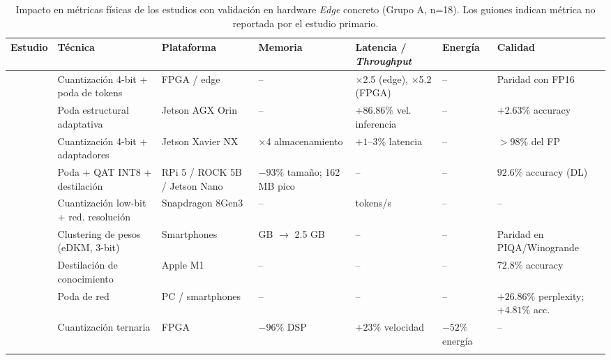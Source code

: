 \begin{table}
\centering
\caption{Impacto en métricas físicas de los estudios con validación en hardware \emph{Edge} concreto (Grupo A, n=18). Los guiones indican métrica no reportada por el estudio primario.}
\label{tab:rq4_grupoA}
\scriptsize
\renewcommand{\arraystretch}{1.3}
\begin{tabularx}{\textwidth}{@{}
    >{\hsize=0.55\hsize\raggedright\arraybackslash}X
    >{\hsize=1.15\hsize\raggedright\arraybackslash}X
    >{\hsize=1.00\hsize\raggedright\arraybackslash}X
    >{\hsize=0.95\hsize\raggedright\arraybackslash}X
    >{\hsize=1.10\hsize\raggedright\arraybackslash}X
    >{\hsize=0.80\hsize\raggedright\arraybackslash}X
    >{\hsize=1.05\hsize\raggedright\arraybackslash}X @{}}
\toprule
\textbf{Estudio} & \textbf{Técnica} & \textbf{Plataforma} & \textbf{Memoria} & \textbf{Latencia / \emph{Throughput}} & \textbf{Energía} & \textbf{Calidad} \\
\midrule
\cite{Shen2024} & Cuantización 4-bit + poda de tokens & FPGA / edge & -- & $\times$2.5 (edge), $\times$5.2 (FPGA) & -- & Paridad con FP16 \\
\addlinespace
\cite{Zheng2026a} & Poda estructural adaptativa & Jetson AGX Orin & -- & $+86.86\%$ vel. inferencia & -- & $+2.63\%$ accuracy \\
\addlinespace
\cite{Parashar2026} & Cuantización 4-bit + adaptadores & Jetson Xavier NX & $\times$4 almacenamiento & $+1$--$3\%$ latencia & -- & $>98\%$ del FP \\
\addlinespace
\cite{Ragsdale2026} & Poda + QAT INT8 + destilación & RPi 5 / ROCK 5B / Jetson Nano & $-93\%$ tamaño; 162 MB pico & -- & -- & $92.6\%$ accuracy (DL) \\
\addlinespace
\cite{Shao2025} & Cuantización low-bit + red. resolución & Snapdragon 8Gen3 & -- & 13 tokens/s & -- & -- \\
\addlinespace
\cite{Cho2024} & Clustering de pesos (eDKM, 3-bit) & Smartphones & 12.6 GB $\to$ 2.5 GB & -- & -- & Paridad en PIQA/Winogrande \\
\addlinespace
\cite{Pradhan2026} & Destilación de conocimiento & Apple M1 & -- & -- & -- & $72.8\%$ accuracy \\
\addlinespace
\cite{Sun2026} & Poda de red & PC / smartphones & -- & -- & -- & $+26.86\%$ perplexity; $+4.81\%$ acc. \\
\addlinespace
\cite{Monteiro2026} & Cuantización ternaria & FPGA & $-96\%$ DSP & $+23\%$ velocidad & $-52\%$ energía & -- \\
\addlinespace

\end{tabularx}
\end{table}
